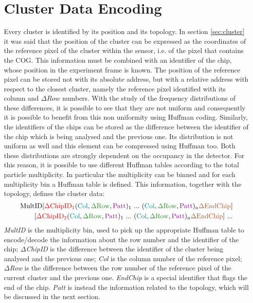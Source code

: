 \section{Cluster Data Encoding}
Every cluster is identified by its position and its topology. In section \ref{sec:cluster} it was said that the position of the cluster can be expressed as the coordinates of the reference pixel of the cluster within the sensor, i.e. of the pixel that contains the COG. This information must be combined with an identifier of the chip, whose position in the experiment frame is known. The position of the reference pixel can be stored not with its absolute address, but with a relative address with respect to the closest cluster, namely the reference pixel identified with its column and $\Delta Row$ numbers. With the study of the frequency distributions of these differences, it is possible to see that they are not uniform and consequently it is possible to benefit from this non uniformity using Huffman coding. Similarly, the identifiers of the chips can be stored as the difference between the identifier of the chip which is being analysed and the previous one. Its distribution is not uniform as well and this element can be compressed using Huffman too. Both these distributions are strongly dependent on the occupancy in the detector. For this reason, it is possible to use different Huffman tables according to the total particle multiplicity. In particular the multiplicity can be binned and for each multiplicity bin a Huffman table is defined. This information, together with the topology, defines the cluster data:
\begin{displaymath}
\begin{split}
  \mathrm{MultID[\textcolor{red}{\Delta ChipID_1}(\textcolor{Cerulean}{Col}, \textcolor{LimeGreen}{\Delta Row}, \textcolor{Plum}{Patt})_1 \  ... \ (\textcolor{Cerulean}{Col}, \textcolor{LimeGreen}{\Delta Row}, \textcolor{Plum}{Patt})_n \textcolor{SkyBlue}{\Delta EndChip}] }\\
 \mathrm{[\textcolor{red}{\Delta ChipID_2}(\textcolor{Cerulean}{Col}, \textcolor{LimeGreen}{\Delta Row}, \textcolor{Plum}{Patt})_1 \  ... \ (\textcolor{Cerulean}{Col}, \textcolor{LimeGreen}{\Delta Row}, \textcolor{Plum}{Patt})_n \textcolor{SkyBlue}{\Delta EndChip}]\ ...}
 \end{split}
\end{displaymath}
\textit{MultID} is the multiplicity bin, used to pick up the appropriate Huffman table to encode/decode the information about the row number and the identifier of the chip; \textit{$\Delta$ChipID} is the difference between the identifier of the cluster being analysed and the previous one; \textit{Col} is the column number of the reference pixel; \textit{$\Delta$Row} is the difference between the row number of the reference pixel of the current cluster and the previous one. \textit{EndChip} is a special identifier that flags the end of the chip. \textit{Patt} is instead the information related to the topology, which will be discussed in the next section.
